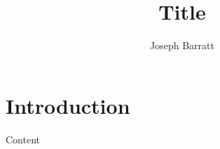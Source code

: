\documentclass{article}
\author{Joseph Barratt}
\title{Title}
\date{}
\begin{document}
\maketitle

\begin{comment}
	Assignment
\end{comment}

\section*{Introduction}
	Content
\end{document}
